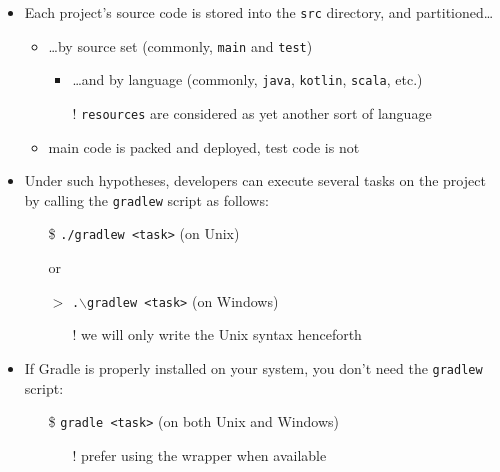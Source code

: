 \documentclass[presentation]{beamer}\mode<presentation>{\usetheme{AMSBolognaFC}}
\begin{document}
\begin{frame}[allowframebreaks]
\begin{itemize}
        \item Each project's source code is stored into the \alert{\texttt{src}} directory, and partitioned\ldots
        \begin{itemize}
            \item \ldots by source set (commonly, \alert{\texttt{main}} and \alert{\texttt{test}})
            \begin{itemize}
                \item \ldots and by language (commonly, \alert{\texttt{java}}, \texttt{kotlin}, \texttt{scala}, etc.)
                \item[!] \alert{\texttt{resources}} are considered as yet another sort of language
            \end{itemize}
            \item main code is packed and deployed, test code is not
        \end{itemize}

        \framebreak

        \item Under such hypotheses, developers can execute several tasks on the project by calling the \texttt{gradlew} script as follows:
        \begin{itemize}
            \item[\$] \texttt{\alert{./}gradlew \alert{<task>}} \quad (on Unix)
            \item[] or
            \item[$>$] \texttt{\alert{.$\backslash$}gradlew \alert{<task>}} \quad (on Windows)
            \begin{itemize}
                \item[!] we will only write the Unix syntax henceforth
            \end{itemize}
        \end{itemize}

        \bigskip

        \item If Gradle is properly installed on your system, you don't need the \texttt{gradlew} script:
        \begin{itemize}
            \item[\$] \texttt{gradle \alert{<task>}} \quad (on both Unix and Windows)
            \begin{itemize}
                \item[!] prefer using the wrapper when available
            \end{itemize}
        \end{itemize}


\end{itemize}
\end{frame}
\end{document}
